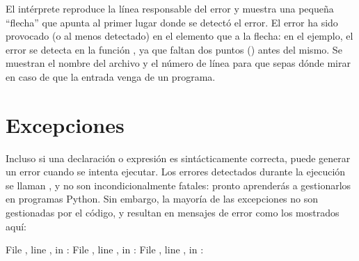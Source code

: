 \documentclass[a5paper,10pt,spanish]{sphinxmanual}
\begin{document}
\sphinxAtStartPar
El intérprete reproduce la línea responsable del error y muestra una pequeña “flecha” que apunta al primer lugar donde se detectó el error.  El error ha sido provocado (o al menos detectado) en el elemento que  a la flecha: en el ejemplo, el error se detecta en la función , ya que faltan dos puntos () antes del mismo.  Se muestran el nombre del archivo y el número de línea para que sepas dónde mirar en caso de que la entrada venga de un programa.


\section{Excepciones}
\label{\detokenize{tutorial/errors:exceptions}}\label{\detokenize{tutorial/errors:tut-exceptions}}
\sphinxAtStartPar
Incluso si una declaración o expresión es sintácticamente correcta, puede generar un error cuando se intenta ejecutar.  Los errores detectados durante la ejecución se llaman , y no son incondicionalmente fatales: pronto aprenderás a gestionarlos en programas Python.  Sin embargo, la mayoría de las excepciones no son gestionadas por el código, y resultan en mensajes de error como los mostrados aquí:

\begin{sphinxVerbatim}[commandchars=\\\{\}]
  
  File , line , in 
: 
  
  File , line , in 
: 
  
  File , line , in 
: 
\end{sphinxVerbatim}
\end{document}
